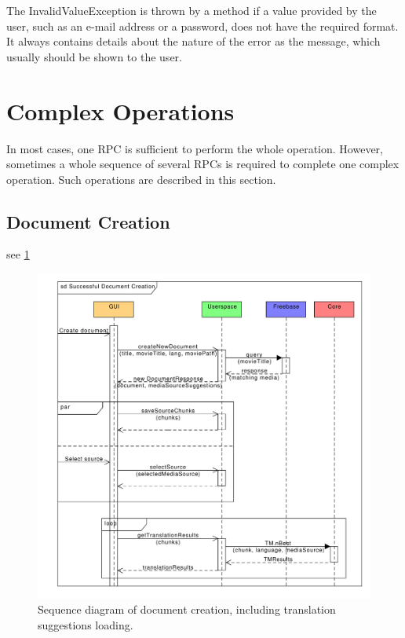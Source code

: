 The InvalidValueException is thrown by a method if a value provided by the user, such as an e-mail address or a password, does not have the required format. It always contains details about the nature of the error as the message, which usually should be shown to the user.

\section{Complex Operations}

In most cases, one RPC is sufficient to perform the whole operation. However, sometimes a whole sequence of several RPCs is required to complete one complex operation. Such operations are described in this section.

\subsection{Document Creation}

see \ref{rpc:sd:document_creation}


\begin{figure}[h]
\begin{center}
\includegraphics[scale=0.65]{figures/document_creation_sequence_RPC.pdf}
\end{center}
\caption{Sequence diagram of document creation, including translation suggestions loading.}\label{rpc:sd:document_creation}
\end{figure}

